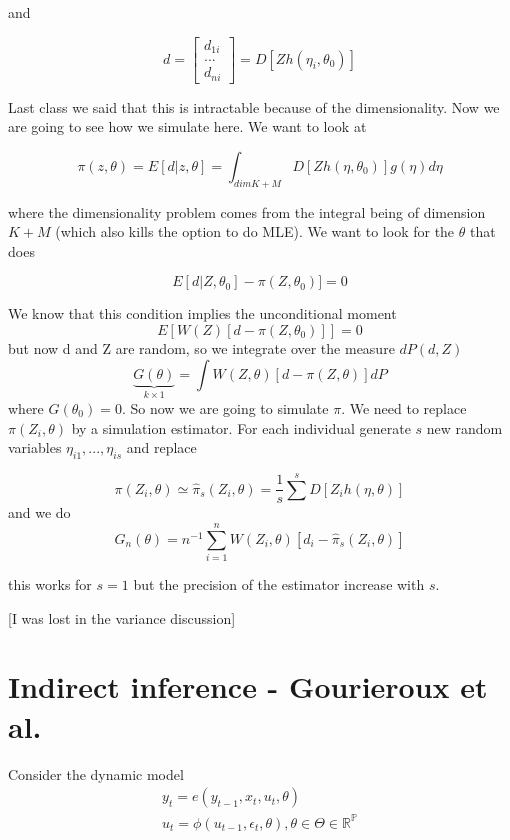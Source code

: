 \documentclass[12pt]{article}
\begin{document}
and 

\begin{equation*}
	d = \left[ \begin{matrix}
		d_{1i} \\
		...\\
		d_{ni}
	\end{matrix} \right] = D[Zh(\eta_i, \theta_0)]
\end{equation*}

Last class we said that this is intractable because of the dimensionality. Now we are going to see how we simulate here. We want to look at 

\begin{equation*}
	\pi(z,\theta) = E[d | z,\theta] = \int_{dim K+M} D[Z h(\eta, \theta_0)] g(\eta) d\eta 
\end{equation*}

where the dimensionality problem comes from the integral being of dimension $K+M$ (which also kills the option to do MLE). We want to look for the $\theta$ that does

\begin{equation*}
	E[d|Z,\theta_0] - \pi(Z,\theta_0)] = 0 
\end{equation*}
 
 We know that this condition implies the unconditional moment
 \begin{equation*}
	E[ W(Z) [ d - \pi(Z,\theta_0)]] = 0 
\end{equation*}
but now d and Z are random, so we integrate over the measure $dP(d,Z)$
 \begin{equation*}
	\underbrace{G(\theta)}_{k \times 1} = \int W(Z,\theta) [ d - \pi(Z,\theta)] dP  
\end{equation*}
where $G(\theta_0) = 0$. So now we are going to simulate $\pi$. We need to replace $ \pi(Z_i,\theta)$ by a simulation estimator. For each individual generate $s$ new random variables $\eta_{i1},...,\eta_{is}$ and replace 

\begin{equation*}
	 \pi(Z_i,\theta) \simeq \hat{\pi}_s(Z_i, \theta) = \frac{1}{s} \sum^s D[Z_i h(\eta, \theta)]
\end{equation*}
and we do 
\begin{equation*}
	G_n(\theta) = n^{-1} \sum^n_{i = 1} W(Z_i,\theta) [d_i - \hat{\pi}_s(Z_i, \theta)]  
\end{equation*}

this works for $s = 1$ but the precision of the estimator increase with $s$. 

[I was lost in the variance discussion]

\section*{Indirect inference - Gourieroux et al.}

Consider the dynamic model
\begin{eqnarray*}
	y_t = e(y_{t-1}, x_t, u_t, \theta) \\
	u_t = \phi(u_{t-1}, \epsilon_{t}, \theta), \theta\in \Theta \in \mathbb{R}^{\mathbb{P}}
\end{eqnarray*}
\end{document}
